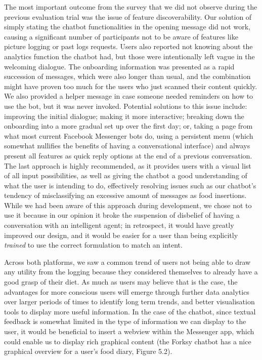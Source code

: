 The most important outcome from the survey that we did not observe during the previous evaluation trial was the issue of feature discoverability. Our solution of simply stating the chatbot functionalities in the opening message did not work, causing a significant number of participants not to be aware of features like picture logging or past logs requests. Users also reported not knowing about the analytics function the chatbot had, but those were intentionally left vague in the welcoming dialogue. The onboarding information was presented as a rapid succession of messages, which were also longer than usual, and the combination might have proven too much for the users who just scanned their content quickly. We also provided a helper message in case someone needed reminders on how to use the bot, but it was never invoked. Potential solutions to this issue include: improving the initial dialogue; making it more interactive; breaking down the onboarding into a more gradual set up over the first day; or, taking a page from what most current Facebook Messenger bots do, using a persistent menu (which somewhat nullifies the benefits of having a conversational interface) and always present all features as quick reply options at the end of a previous conversation. The last approach is highly recommended, as it provides users with a visual list of all input possibilities, as well as giving the chatbot a good understanding of what the user is intending to do, effectively resolving issues such as our chatbot's tendency of misclassifying an excessive amount of messages as food insertions. While we had been aware of this approach during development, we chose not to use it because in our opinion it broke the suspension of disbelief of having a conversation with an intelligent agent; in retrospect, it would have greatly improved our design, and it would be easier for a user than being explicitly \textit{trained} to use the correct formulation to match an intent. 

Across both platforms, we saw a common trend of users not being able to draw any utility from the logging because they considered themselves to already have a good grasp of their diet. As much as users may believe that is the case, the advantages for more conscious users will emerge through further data analytics over larger periods of times to identify long term trends, and better visualisation tools to display more useful information. In the case of the chatbot, since textual feedback is somewhat limited in the type of information we can display to the user, it would be beneficial to insert a webview within the Messenger app, which could enable us to display rich graphical content (the Forksy chatbot \cite{forksywebsite} has a nice graphical overview for a user's food diary, Figure 5.2). 

